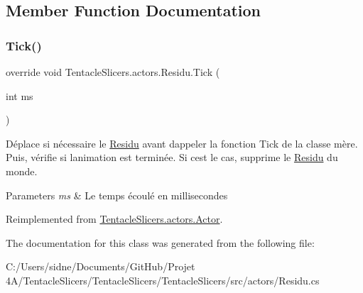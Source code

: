 \subsection{Member Function Documentation}
\mbox{\label{class_tentacle_slicers_1_1actors_1_1_residu_a429af1b4c0a6bdbb4cb2e42a1f3ba571}} 
\subsubsection{\texorpdfstring{Tick()}{Tick()}}
{\footnotesize\ttfamily override void Tentacle\+Slicers.\+actors.\+Residu.\+Tick (\begin{DoxyParamCaption}\item[{int}]{ms }\end{DoxyParamCaption})\hspace{0.3cm}{\ttfamily [virtual]}}



Déplace si nécessaire le \hyperlink{class_tentacle_slicers_1_1actors_1_1_residu}{Residu} avant d\textquotesingle{}appeler la fonction Tick de la classe mère. Puis, vérifie si l\textquotesingle{}animation est terminée. Si c\textquotesingle{}est le cas, supprime le \hyperlink{class_tentacle_slicers_1_1actors_1_1_residu}{Residu} du monde. 


\begin{DoxyParams}{Parameters}
{\em ms} & Le temps écoulé en millisecondes \\
\hline
\end{DoxyParams}


Reimplemented from \hyperlink{class_tentacle_slicers_1_1actors_1_1_actor_a13e48a1ca022ce7c971c77f1354e3daf}{Tentacle\+Slicers.\+actors.\+Actor}.



The documentation for this class was generated from the following file\+:\begin{DoxyCompactItemize}
\item 
C\+:/\+Users/sidne/\+Documents/\+Git\+Hub/\+Projet 4\+A/\+Tentacle\+Slicers/\+Tentacle\+Slicers/\+Tentacle\+Slicers/src/actors/Residu.\+cs\end{DoxyCompactItemize}
